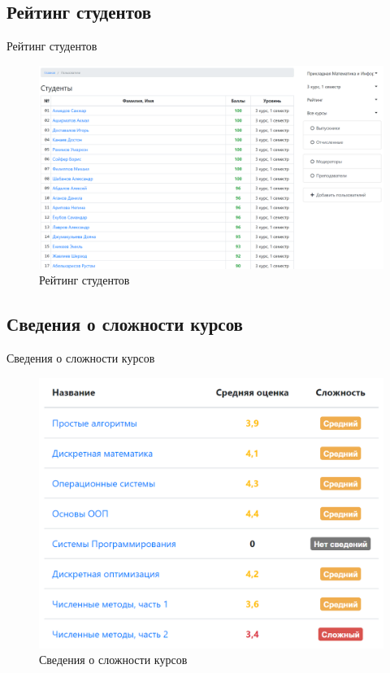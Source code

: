 \documentclass[10pt,pdf,hyperref={unicode}]{beamer}
\begin{document}
\subsection{Рейтинг студентов}
\begin{frame}{Рейтинг студентов}
    \begin{figure}
        \includegraphics[scale=0.16]{rating}
        \caption{Рейтинг студентов}
        \centering
    \end{figure}
\end{frame}
\subsection{Сведения о сложности курсов}
\begin{frame}{Сведения о сложности курсов}
    \begin{figure}
        \includegraphics[scale=0.25]{course-difficulty}
        \caption{Сведения о сложности курсов}
        \centering
    \end{figure}
\end{frame}
\end{document}
